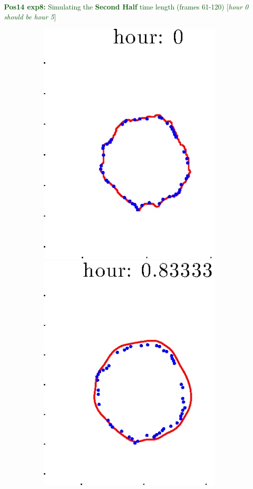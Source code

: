 \documentclass[12pt]{article}
\begin{document}
\clearpage

\noindent \textcolor{DarkGreen}{\textbf{Pos14 exp8:} Simulating the \textbf{Second Half} time length (frames 61-120) [\textit{hour 0 should be hour 5}]}

\begin{figure}[h!]
\centering
	\begin{subfigure}[b]{.3\textwidth}
	\centering
		\includegraphics[height=.15\textheight]{Pos14exp8/secondhalf/full1.eps}
		\includegraphics[height=.15\textheight]{Pos14exp8/secondhalf/full2.eps}

\end{subfigure}
\end{figure}
\end{document}
